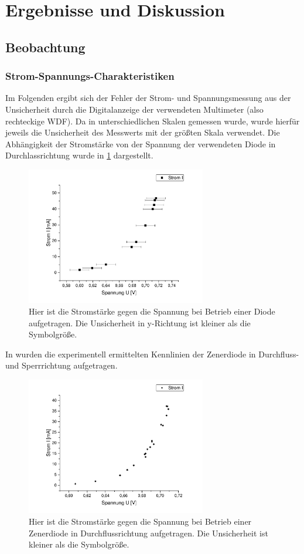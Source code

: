 \documentclass[
	a4paper,
	12pt,
	pagesize,
	ngerman
]{scrartcl}
\begin{document}
	\section{Ergebnisse und Diskussion}

	\subsection{Beobachtung}
	\subsubsection{Strom-Spannungs-Charakteristiken}
	Im Folgenden ergibt sich der Fehler der Strom- und Spannungsmessung aus der Unsicherheit durch die Digitalanzeige der verwendeten Multimeter (also rechteckige WDF).
	Da in unterschiedlichen Skalen gemessen wurde, wurde hierfür jeweils die Unsicherheit des Messwerts mit der größten Skala verwendet.
	Die Abhängigkeit der Stromstärke von der Spannung der verwendeten Diode in Durchlassrichtung wurde in \cref{Diode} dargestellt.
	\begin{figure}[H]
		\includegraphics[width=0.7\textwidth]{Diode}
		\centering
		\caption{Hier ist die Stromstärke  gegen die Spannung bei Betrieb einer Diode aufgetragen. Die Unsicherheit in y-Richtung ist kleiner als die Symbolgröße.}
		\label{Diode}
		\centering
	\end{figure} 
	In  wurden die experimentell ermittelten Kennlinien der Zenerdiode in Durchfluss- und Sperrrichtung aufgetragen.
	\begin{figure}[H]
		\includegraphics[width=0.7\textwidth]{Zener_Durch}
		\centering
		\caption{Hier ist die Stromstärke  gegen die Spannung bei Betrieb einer Zenerdiode in Durchflussrichtung aufgetragen. Die Unsicherheit ist kleiner als die Symbolgröße.}
		\label{Zener_Durch}
		\centering
	\end{figure}
\end{document}
